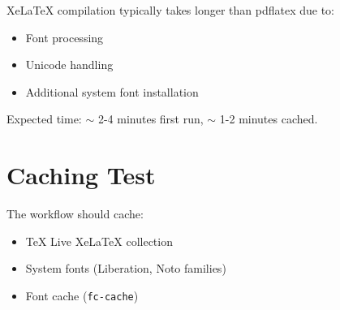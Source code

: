\documentclass{article}
\begin{document}
XeLaTeX compilation typically takes longer than pdflatex due to:
\begin{itemize}
    \item Font processing
    \item Unicode handling
    \item Additional system font installation
\end{itemize}

Expected time: $\sim$ 2-4 minutes first run, $\sim$ 1-2 minutes cached.

\section{Caching Test}

The workflow should cache:
\begin{itemize}
    \item TeX Live XeLaTeX collection
    \item System fonts (Liberation, Noto families)
    \item Font cache (\texttt{fc-cache})
\end{itemize}
\end{document}

